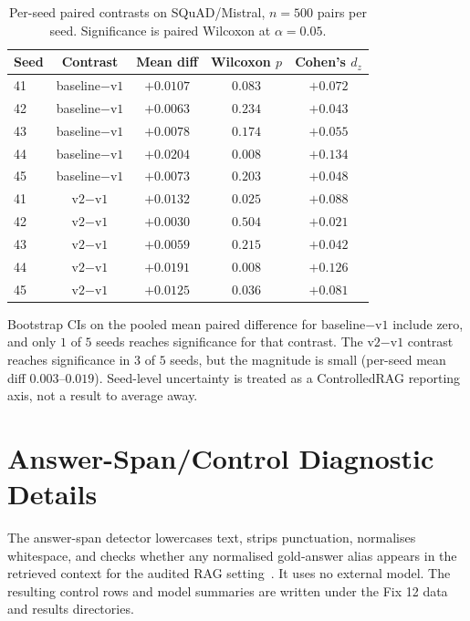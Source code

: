 \documentclass[11pt]{article}
\begin{document}
\begin{table}[!htb]
\centering
\caption{Per-seed paired contrasts on SQuAD/Mistral, $n=500$ pairs per
seed. Significance is paired Wilcoxon at $\alpha=0.05$.}
\label{tab:supp:scaled_per_seed}
\footnotesize
\begin{tabular}{lcccc}
\toprule
Seed & Contrast & Mean diff & Wilcoxon $p$ & Cohen's $d_z$ \\
\midrule
41 & baseline$-$v$1$ & $+0.0107$ & $0.083$ & $+0.072$ \\
42 & baseline$-$v$1$ & $+0.0063$ & $0.234$ & $+0.043$ \\
43 & baseline$-$v$1$ & $+0.0078$ & $0.174$ & $+0.055$ \\
44 & baseline$-$v$1$ & $+0.0204$ & $\mathbf{0.008}$ & $+0.134$ \\
45 & baseline$-$v$1$ & $+0.0073$ & $0.203$ & $+0.048$ \\
\midrule
41 & v$2$$-$v$1$ & $+0.0132$ & $\mathbf{0.025}$ & $+0.088$ \\
42 & v$2$$-$v$1$ & $+0.0030$ & $0.504$ & $+0.021$ \\
43 & v$2$$-$v$1$ & $+0.0059$ & $0.215$ & $+0.042$ \\
44 & v$2$$-$v$1$ & $+0.0191$ & $\mathbf{0.008}$ & $+0.126$ \\
45 & v$2$$-$v$1$ & $+0.0125$ & $\mathbf{0.036}$ & $+0.081$ \\
\bottomrule
\end{tabular}
\end{table}

Bootstrap CIs on the pooled mean paired difference for
baseline$-$v$1$ include zero, and only $1$ of $5$ seeds reaches
significance for that contrast. The v$2$$-$v$1$ contrast reaches
significance in $3$ of $5$ seeds, but the magnitude is small (per-seed
mean diff $0.003$--$0.019$). Seed-level uncertainty is treated as a
ControlledRAG reporting axis, not a result to average away.

\section{Answer-Span/Control Diagnostic Details}
\label{supp:span}

The answer-span detector lowercases text, strips punctuation,
normalises whitespace, and checks whether any normalised gold-answer
alias appears in the retrieved context for the audited RAG
setting~\citep{lewis2020rag}. It uses no external model. The resulting
control rows and model summaries are written under the Fix 12 data and
results directories.
\end{document}

